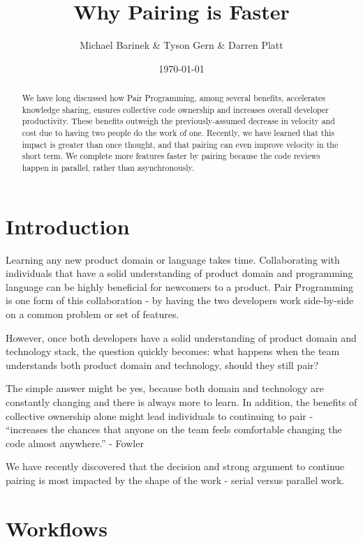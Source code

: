 \documentclass[letterpaper]{article}
\title{Why Pairing is Faster}
\author{Michael Barinek \& Tyson Gern \& Darren Platt}
\date{\today}
\theoremstyle{definition}
\begin{document}
    \maketitle

    \begin{abstract}
    We have long discussed how Pair Programming, among several benefits, accelerates knowledge sharing, ensures collective
    code ownership and increases overall developer productivity. These benefits outweigh the previously-assumed decrease
    in velocity and cost due to having two people do the work of one. Recently, we have learned that this impact is greater
    than once thought, and that pairing can even improve velocity in the short term. We complete more features faster by
    pairing because the code reviews happen in parallel, rather than asynchronously.

    \end{abstract}

    \section{Introduction}\label{sec:introduction}

    Learning any new product domain or language takes time. Collaborating with individuals that have a solid understanding
    of product domain and programming language can be highly beneficial for newcomers to a product. Pair Programming is
    one form of this collaboration - by having the two developers work side-by-side on a common problem or set of features.

    However, once both developers have a solid understanding of product domain and technology stack, the question quickly
    becomes: what happens when the team understands both product domain and technology, should they still pair?

    The simple answer might be yes, because both domain and technology are constantly changing and there is always more
    to learn. In addition, the benefits of collective ownership alone might lead individuals to continuing to pair -
    “increases the chances that anyone on the team feels comfortable changing the code almost anywhere.” - Fowler

    We have recently discovered that the decision and strong argument to continue pairing is most impacted by the shape
    of the work - serial versus parallel work.

    \section{Workflows}\label{sec:workflows}
\end{document}

